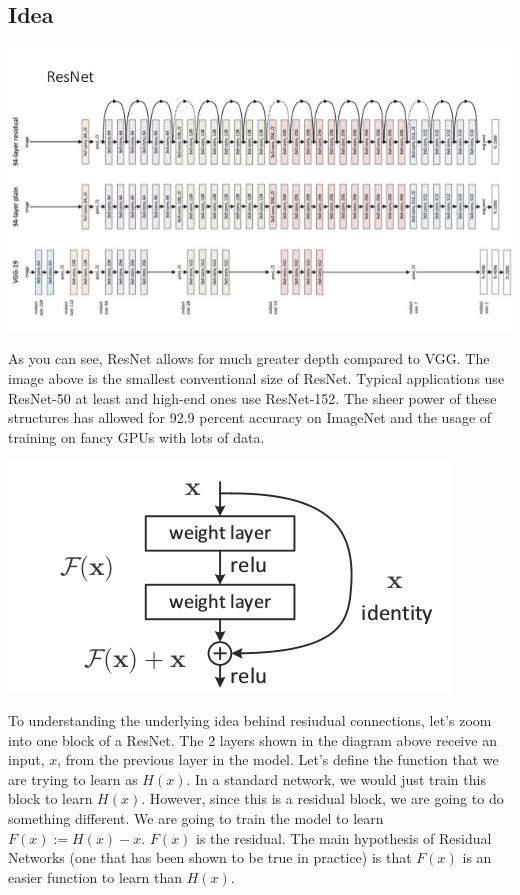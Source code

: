\documentclass{article}
\begin{document}
\subsection{Idea}
\begin{center}
\includegraphics[scale=0.5]{resnet.jpg}
\end{center}
As you can see, ResNet allows for much greater depth compared to VGG. The image above is the smallest conventional size of ResNet. Typical applications use ResNet-50 at least and high-end ones use ResNet-152. The sheer power of these structures has allowed for 92.9 percent accuracy on ImageNet and the usage of training on fancy GPUs with lots of data.

\begin{center}
\includegraphics[scale=0.5]{resnet}
\end{center}
To understanding the underlying idea behind resiudual connections, let's zoom into one block of a ResNet. The 2 layers shown in the diagram above receive an input, $x$, from the previous layer in the model. Let's define the function that we are trying to learn as $H(x)$. In a standard network, we would just train this block to learn $H(x)$. However, since this is a residual block, we are going to do something different. We are going to train the model to learn $F(x) := H(x) - x$. $F(x)$ is the residual. The main hypothesis of Residual Networks (one that has been shown to be true in practice) is that $F(x)$ is an easier function to learn than $H(x)$. \\
\end{document}

